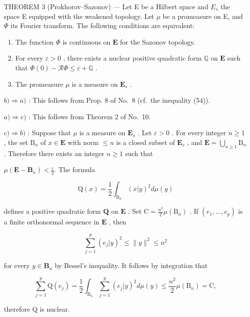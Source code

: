 THEOREM 3 (Prokhorov--Sazonov) --- Let E be a Hilbert space and \(E_{s}\) the space E equipped with the weakened topology. Let \(\mu\) be a promeasure on E, and \(\Phi\) its Fourier transform. The following conditions are equivalent:

\begin{enumerate}
\def\labelenumi{\alph{enumi})}
\item
  The function \(\Phi\) is continuous on \(\mathbf{E}\) for the Sazonov topology.
\item
  For every \(\varepsilon > 0\) , there exists a nuclear positive quadratic form \(\mathbb{Q}\) on \(\mathbf{E}\) such that \(\Phi(0) - \mathcal{R}\Phi \leqslant \varepsilon + \mathbb{Q}\) .
\item
  The promeasure \(\mu\) is a measure on \(\mathbf{E}_s\) .
\end{enumerate}

\(b) \Rightarrow a)\) : This follows from Prop. 8 of No.~8 (cf.~the inequality (54)).

\(a) \Rightarrow c)\) : This follows from Theorem 2 of No.~10.

\(c) \Rightarrow b)\) : Suppose that \(\mu\) is a measure on \(\mathbf{E}_s\) . Let \(\varepsilon > 0\) . For every integer \(n \geqslant 1\) , the set \(\mathrm{B}_n\) of \(x \in \mathbf{E}\) with norm \(\leqslant n\) is a closed subset of \(\mathbf{E}_s\) , and \(\mathbf{E} = \bigcup_{n \geqslant 1} \mathrm{B}_n\) . Therefore there exists an integer \(n \geqslant 1\) such that

\(\mu (\mathbf{E} - \mathbf{B}_n) <   \frac{\varepsilon}{2}.\) The formula

\[
\mathrm{Q} (x) = \frac {1}{2} \int_ {\mathrm{B} _ {n}} (x | y) ^ {2} d \mu (y)\tag{65}
\]

defines a positive quadratic form \(\mathbf{Q}\) on \(\mathbf{E}\) . Set \(\mathrm{C} = \frac{n^2}{2}\mu (\mathrm{B}_n)\) . If \((e_1,\ldots ,e_p)\) is a finite orthonormal sequence in \(\mathbf{E}\) , then

\[
\sum_ {j = 1} ^ {p} (e _ {j} | y) ^ {2} \leqslant \| y \| ^ {2} \leqslant n ^ {2}
\]

for every \(y \in \mathbf{B}_n\) by Bessel's inequality. It follows by integration that

\[
\sum_ {j = 1} ^ {p} \mathrm{Q} (e _ {j}) = \frac {1}{2} \int_ {\mathrm{B} _ {n}} \sum_ {j = 1} ^ {p} (e _ {j} | y) ^ {2} d \mu (y) \leqslant \frac {n ^ {2}}{2} \mu (\mathrm{B} _ {n}) = \mathrm{C},
\]

therefore Q is nuclear.

